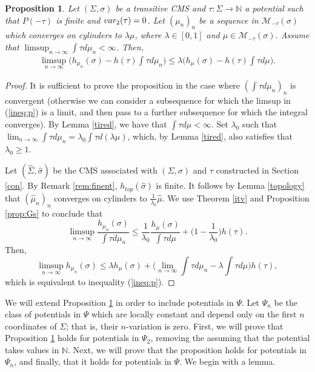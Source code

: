 \documentclass[letterpaper,11pt]{amsart}
\theoremstyle{plain}
\theoremstyle{plain}
\newtheorem{proposition}{Proposition}[subsection]
\theoremstyle{definition}
\theoremstyle{remark}
\def\N{{\mathbb N}}
\def\M{{\mathcal M}}
\begin{document}
\begin{proposition}\label{theo:3}  Let $(\Sigma,\sigma)$ be a transitive CMS and $\tau:\Sigma\to\N$ a potential such that  $P(-\tau)$ is finite and $\emph{var}_2(\tau)=0$. Let $(\mu_n)_n$ be a sequence  in $\M_{-\tau}(\sigma)$ which converges on cylinders to $\lambda\mu$, where $\lambda\in [0,1]$ and $\mu\in \M_{-\tau}(\sigma)$. Assume that $\limsup_{n\to\infty}\int \tau d\mu_n<\infty$. Then,
\begin{align}\label{ineq:p}\limsup_{n\to\infty}\big(h_{\mu_n}(\sigma)-h(\tau)\int \tau d\mu_n\big)\le \lambda\big(h_{\mu}(\sigma)-h(\tau)\int \tau d\mu\big).\end{align}
\end{proposition}
\begin{proof} It is sufficient to prove the proposition in the case where $(\int \tau d\mu_n)_n$ is convergent (otherwise we can consider a subsequence for which the limsup in  (\ref{ineq:p}) is a limit, and then pass to a further subsequence for which the integral converges). By Lemma \ref{tired}, we have that $\int \tau d\mu<\infty$. Set $\lambda_0$ such that $\lim_{n\to\infty}\int \tau d\mu_n=\lambda_0\int \tau d(\lambda \mu)$, which, by Lemma \ref{tired}, also  satisfies that $\lambda_0\ge 1$.

Let $(\widehat{\Sigma},\widehat{\sigma})$ be the CMS associated with $(\Sigma,\sigma)$ and $\tau$  constructed in Section \ref{con}. By Remark \ref{rem:finent}, $h_{top}(\widehat{\sigma})$ is finite. It follows by Lemma \ref{topology} that $(\hat{\mu}_n)_n$ converges  on cylinders to $\frac{1}{\lambda_0}\hat{\mu}$. We use Theorem \ref{itv} and Proposition \ref{prop:Gs} to conclude that
$$\limsup_{n\to\infty}\frac{h_{\mu_n}(\sigma)}{\int \tau d\mu_n}\le \frac{1}{\lambda_0}\frac{h_\mu(\sigma)}{\int \tau d\mu}+\bigg(1-\frac{1}{\lambda_0}\bigg)h(\tau).$$
Then,
$$\limsup_{n\to\infty} h_{\mu_n}(\sigma) \le \lambda h_\mu(\sigma) +\bigg(\lim_{n\to\infty}\int \tau d\mu_n-\lambda \int \tau d\mu\bigg)h(\tau),$$
which is equivalent to inequality (\ref{ineq:p}).
\end{proof}


We will extend Proposition \ref{theo:3} in order to include potentials in $\Psi$. Let $\Psi_n$ be  the class of potentials in $\Psi$ which are locally constant and depend only on the first $n$ coordinates of $\Sigma$; that is, their $n$-variation is zero. First, we will prove that Proposition \ref{theo:3} holds for potentials in $\Psi_2$, removing the assuming that the potential takes values in $\N$. Next, we will prove that the proposition holds for potentials in $\Psi_n$, and finally, that it holds for potentials in $\Psi$. We begin with a lemma.
\end{document}
